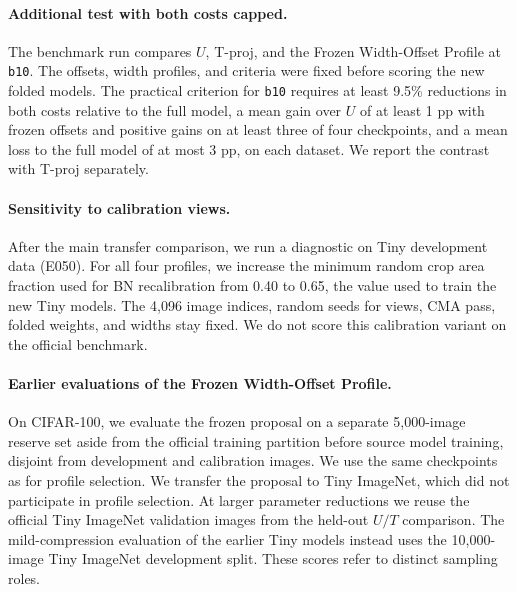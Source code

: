 \documentclass[11pt,a4paper]{article}
\newcommand{\FrozenProfile}{Frozen Width-Offset Profile}
\newcommand{\bten}{\texttt{b10}}
\begin{document}
\paragraph{Additional test with both costs capped.} The benchmark run
compares $U$, T-proj, and the \FrozenProfile{} at \bten{}. The offsets,
width profiles, and criteria were fixed before scoring the new folded
models. The practical criterion for \bten{}
requires at least 9.5\% reductions in both costs relative to the full
model, a mean gain over $U$ of at least 1 pp with frozen offsets and
positive gains on at least three of four checkpoints, and a mean loss
to the full model of at most 3 pp, on each dataset. We report the
contrast with T-proj separately.

\paragraph{Sensitivity to calibration views.} After the main transfer
comparison, we run a diagnostic on Tiny development data (E050). For all
four profiles, we increase the minimum random crop area fraction used
for BN recalibration from 0.40 to 0.65, the value used to train the new
Tiny models. The 4,096 image indices, random seeds for views, CMA pass,
folded weights, and widths stay fixed. We do not score this calibration
variant on the official benchmark.

\paragraph{Earlier evaluations of the \FrozenProfile{}.} On CIFAR-100, we
evaluate the frozen proposal on a separate 5,000-image reserve set aside
from the official training partition before source model training,
disjoint from development and calibration images. We use the same
checkpoints as for profile selection. We transfer the proposal to Tiny
ImageNet, which did not participate in profile selection. At larger
parameter reductions we reuse the official Tiny ImageNet validation
images from the held-out $U/T$ comparison. The mild-compression
evaluation of the earlier Tiny models instead uses the 10,000-image Tiny
ImageNet development split.
These scores refer to distinct sampling roles.
\end{document}
